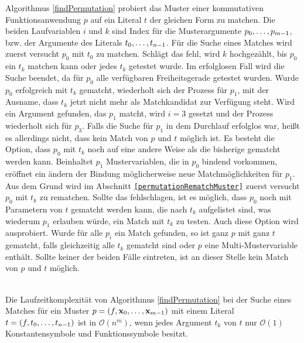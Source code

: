 Algorithmus \ref{findPermutation} probiert das Muster einer kommutativen Funktionsanwendung $p$ auf ein Literal $t$ der gleichen Form zu matchen. Die beiden Laufvariablen $i$ und $k$ sind Index für die Musterargumente ${p}_{0}, \dots, {p}_{m-1}$, bzw. der Argumente des Literals ${t}_{0}, \dots, {t}_{n-1}$. Für die Suche eines Matches wird zuerst versucht $p_0$ mit $t_0$ zu matchen. Schlägt das fehl, wird $k$ hochgezählt, bis $p_0$ ein $t_k$ matchen kann oder jedes $t_k$ getestet wurde. Im erfolglosen Fall wird die Suche beendet, da für $p_0$ alle verfügbaren Freiheitsgerade getestet wurden. Wurde $p_0$ erfolgreich mit $t_k$ gematcht, wiederholt sich der Prozess für $p_1$, mit der Ausname, dass $t_k$ jetzt nicht mehr als Matchkandidat zur Verfügung steht. Wird ein Argument gefunden, das $p_1$ matcht, wird $i = 3$ gesetzt und der Prozess wiederholt sich für $p_3$. Falls die Suche für $p_1$ in dem Durchlauf erfolglos war, heißt es allerdings nicht, dass kein Match von $p$ und $t$ möglich ist. Es besteht die Option, dass $p_0$ mit $t_k$ noch auf eine andere Weise als die bisherige gematcht werden kann. Beinhaltet $p_1$ Mustervariablen, die in $p_0$ bindend vorkommen, eröffnet ein ändern der Bindung möglicherweise neue Matchmöglichkeiten für $p_1$. Aus dem Grund wird im Abschnitt \texttt{\ref{permutationRematchMuster}} zuerst versucht $p_0$ mit $t_k$ zu rematchen. Sollte das fehlschlagen, ist es möglich, dass $p_0$ noch mit Parametern von $t$ gematcht werden kann, die nach $t_k$ aufgelistet sind, was wiederum $p_1$ erlauben würde, ein Match mit $t_k$ zu testen. Auch diese Option wird ausprobiert.
Wurde für alle $p_i$ ein Match gefunden, so ist ganz $p$ mit ganz $t$ gematcht, falls gleichzeitig alle $t_k$ gematcht sind oder $p$ eine Multi-Mustervariable enthält. Sollte keiner der beiden Fälle eintreten, ist an dieser Stelle kein Match von $p$ und $t$ möglich. 


\begin{lemma}\label{lemKomplexitaetFindPermutation}~\\
Die Laufzeitkomplexität von Algorithmus \ref{findPermutation} bei der Suche eines Matches für ein Muster $p = (f, {\mathbf x}_{0}, \dots, {\mathbf x}_{m-1})$ mit einem Literal $t = (f, {t}_{0}, \dots, {t}_{n-1})$ ist in $\mathcal O(n^m)$, wenn jedes Argument $t_k$ von $t$ nur $\mathcal O(1)$ Konstantensymbole und Funktionssymbole besitzt.
\end{lemma}

